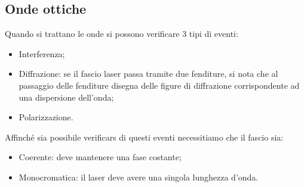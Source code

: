 \documentclass{article}
\begin{document}
\subsection{Onde ottiche}
Quando si trattano le onde si possono verificare 3 tipi di eventi:\begin{itemize}
	\item Interferenza;
	\item Diffrazione: se il fascio laser passa tramite due fenditure, si nota che al passaggio delle fenditure disegna delle figure di diffrazione corrispondente ad una dispersione dell'onda;
	\item Polarizzazione.
\end{itemize}
Affinché sia possibile verificars di questi eventi necessitiamo che il fascio sia:\begin{itemize}
	\item Coerente: deve mantenere una fase costante;
	\item Monocromatica: il laser deve avere una singola lunghezza d'onda.
\end{itemize}
\end{document}
